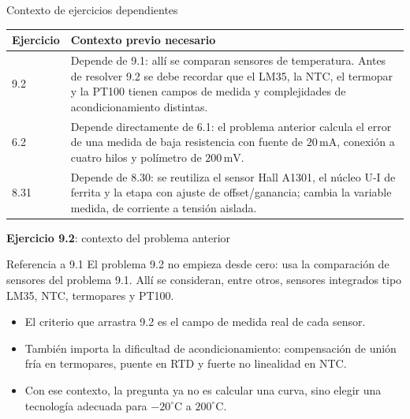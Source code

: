 \documentclass[aspectratio=169,9pt]{beamer}
\newcommand{\exercise}[1]{\textbf{Ejercicio #1}}
\newcommand{\unit}[1]{\,\mathrm{#1}}
\begin{document}
\begin{frame}{Contexto de ejercicios dependientes}
  \small
  \begin{tabularx}{\textwidth}{@{}lX@{}}
    \toprule
    \textbf{Ejercicio} & \textbf{Contexto previo necesario}\\
    \midrule
    9.2 & Depende de 9.1: allí se comparan sensores de temperatura. Antes de resolver 9.2 se debe recordar que el LM35, la NTC, el termopar y la PT100 tienen campos de medida y complejidades de acondicionamiento distintas.\\
    6.2 & Depende directamente de 6.1: el problema anterior calcula el error de una medida de baja resistencia con fuente de \(20\unit{mA}\), conexión a cuatro hilos y polímetro de \(200\unit{mV}\).\\
    8.31 & Depende de 8.30: se reutiliza el sensor Hall A1301, el núcleo U-I de ferrita y la etapa con ajuste de offset/ganancia; cambia la variable medida, de corriente a tensión aislada.\\
    \bottomrule
  \end{tabularx}
\end{frame}

\begin{frame}{\exercise{9.2}: contexto del problema anterior}
  \begin{block}{Referencia a 9.1}
    El problema 9.2 no empieza desde cero: usa la comparación de sensores del problema 9.1. Allí se consideran, entre otros, sensores integrados tipo LM35, NTC, termopares y PT100.
  \end{block}

  \begin{itemize}
    \item El criterio que arrastra 9.2 es el campo de medida real de cada sensor.
    \item También importa la dificultad de acondicionamiento: compensación de unión fría en termopares, puente en RTD y fuerte no linealidad en NTC.
    \item Con ese contexto, la pregunta ya no es calcular una curva, sino elegir una tecnología adecuada para \(-20^\circ\mathrm{C}\) a \(200^\circ\mathrm{C}\).
  \end{itemize}
\end{frame}
\end{document}
